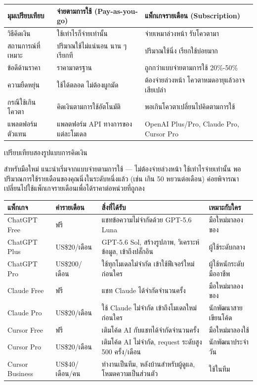 
\begin{center}
\begin{tabularx}{\linewidth}{|X|X|X|}
\hline
\textbf{มุมเปรียบเทียบ} & \textbf{จ่ายตามการใช้ (Pay-as-you-go)} & \textbf{แพ็กเกจรายเดือน (Subscription)} \tabularnewline
\hline
วิธีคิดเงิน & ใช้เท่าไรก็จ่ายเท่านั้น & จ่ายเหมาล่วงหน้า รับโควตามา \tabularnewline
สถานการณ์ที่เหมาะ & ปริมาณใช้ไม่แน่นอน นาน ๆ เรียกที & ปริมาณใช้นิ่ง เรียกใช้บ่อยมาก \tabularnewline
ข้อดีด้านราคา & ราคามาตรฐาน & ถูกกว่าแบบจ่ายตามการใช้ 20\%-50\% \tabularnewline
ความยืดหยุ่น & ใช้ได้ตลอด ไม่ต้องผูกมัด & ต้องจ่ายล่วงหน้า โควตาหมดอายุแล้วอาจเสียเปล่า \tabularnewline
กรณีใช้เกินโควตา & คิดเงินตามการใช้อัตโนมัติ & พอเกินโควตาเปลี่ยนไปคิดตามการใช้ \tabularnewline
แพลตฟอร์มตัวแทน & แพลตฟอร์ม API ทางการของแต่ละโมเดล & OpenAI Plus/Pro, Claude Pro, Cursor Pro \tabularnewline
\hline
\end{tabularx}
\end{center}

\begin{center}\small\color{gray}เปรียบเทียบสองรูปแบบการคิดเงิน\end{center}

สำหรับมือใหม่ แนะนำเริ่มจากแบบจ่ายตามการใช้ — ไม่ต้องจ่ายล่วงหน้า ใช้เท่าไรจ่ายเท่านั้น พอปริมาณการใช้รายเดือนของคุณนิ่งในระดับหนึ่งแล้ว (เช่น เกิน 50 หยวนต่อเดือน) ค่อยพิจารณาเปลี่ยนไปใช้แพ็กเกจรายเดือนเพื่อได้ราคาต่อหน่วยที่ถูกลง


\begin{center}
\begin{tabularx}{\linewidth}{|X|X|X|X|}
\hline
\textbf{แพ็กเกจ} & \textbf{ค่ารายเดือน} & \textbf{สิ่งที่ได้รับ} & \textbf{เหมาะกับใคร} \tabularnewline
\hline
ChatGPT Free & ฟรี & แชทข้อความไม่จำกัดด้วย GPT-5.6 Luna & มือใหม่มาลองของ \tabularnewline
ChatGPT Plus & US\$20/เดือน & GPT-5.6 Sol, สร้างรูปภาพ, วิเคราะห์ข้อมูล, เข้าถึงปลั๊กอิน & ผู้ใช้ระดับกลาง \tabularnewline
ChatGPT Pro & US\$200/เดือน & ใช้ทุกโมเดลไม่จำกัด เข้าใช้ฟีเจอร์ใหม่ก่อนใคร & ผู้ใช้หนักระดับมืออาชีพ \tabularnewline
Claude Free & ฟรี & แชท Claude ได้จำกัดจำนวนครั้ง & มือใหม่มาลองของ \tabularnewline
Claude Pro & US\$20/เดือน & ใช้ Claude ไม่จำกัด เข้าถึงโมเดลใหม่ก่อนใคร & นักพัฒนาสายเขียนโค้ด \tabularnewline
Cursor Free & ฟรี & เติมโค้ด AI กับแชทได้จำกัดจำนวนครั้ง & มือใหม่มาลองใช้ \tabularnewline
Cursor Pro & US\$20/เดือน & เติมโค้ด AI ไม่จำกัด, request ระดับสูง 500 ครั้ง/เดือน & นักพัฒนาประจำวัน \tabularnewline
Cursor Business & US\$40/เดือน/คน & ทำงานเป็นทีม, หลังบ้านสำหรับผู้ดูแล, โหมดความเป็นส่วนตัว & ใช้ในทีม \tabularnewline
\hline
\end{tabularx}
\end{center}

